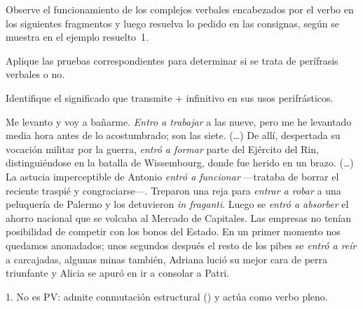 \begin{ejercicio}\label{ej:11-entrar}
Observe el funcionamiento de los complejos verbales encabezados por el verbo
 en los siguientes fragmentos y luego resuelva lo pedido en las
consignas, según se muestra en el ejemplo resuelto~1.

\begin{consignas}
  \item Aplique las pruebas correspondientes para determinar si se trata de
        perífrasis verbales o no.
  \item Identifique el significado que transmite  + infinitivo en
        sus usos perifrásticos.
\end{consignas}

\begin{exe}
  \ex Me levanto y voy a bañarme. \textit{Entro a trabajar} a las nueve, pero me
      he levantado media hora antes de lo acostumbrado; son las siete.
  \ex (\ldots) De allí, despertada su vocación militar por la guerra,
      \textit{entró a formar} parte del Ejército del Rin, distinguiéndose en la
      batalla de Wissembourg, donde fue herido en un brazo.
  \ex (\ldots) La astucia imperceptible de Antonio \textit{entró a funcionar}
      ---trataba de borrar el reciente traspié y congraciarse---.
  \ex Treparon una reja para \textit{entrar a robar} a una peluquería de Palermo
      y los detuvieron \textit{in fraganti}.
  \ex Luego se \textit{entró a absorber} el ahorro nacional que se volcaba al
      Mercado de Capitales. Las empresas no tenían posibilidad de competir con
      los bonos del Estado.
  \ex En un primer momento nos quedamos anonadados; unos segundos después el
      resto de los pibes se \textit{entró a reír} a carcajadas, algunas minas
      también, Adriana lució su mejor cara de perra triunfante y Alicia se apuró
      en ir a consolar a Patri.
\end{exe}


\begin{resuelto}
1. No es PV: admite conmutación estructural () y  actúa como verbo pleno.
\end{resuelto}
\end{ejercicio}

